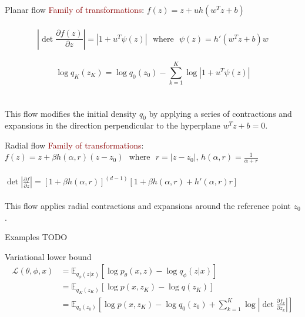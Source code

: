 \documentclass[unicode,11pt]{beamer}
\begin{document}
\begin{frame}[fragile]{Planar flow}
  \textcolor{darkred}{Family of transformations}: $f(z) = z + uh\left( w^T z + b \right)$\\
  ~\\
  $$\left\vert \det \frac{\partial f(z)}{\partial z} \right\vert = \left\vert 1 + u^T \psi(z)
  \right\vert ~~~\text{where}~~~ \psi(z) = h'(w^Tz + b)w$$ \\
  $$\log q_K(z_K) = \log q_0(z_0) − \sum_{k=1}^K \log \left\vert 1 + u^T \psi(z) \right\vert $$\\
  ~\\
  This flow modifies the initial density $q_0$ by applying a series of contractions and expansions in
  the direction perpendicular to the hyperplane $w^Tz+b = 0$.

\end{frame}

\begin{frame}[fragile]{Radial flow}
  \textcolor{darkred}{Family of transformations}: \\
  $f(z) = z + \beta h(\alpha, r)(z-z_0) ~~~\text{where}~~~ r = \vert z-z_0 \vert$,
  $h(\alpha, r) = \frac{1}{\alpha + r}$\\
  ~\\
  $\det \left\vert \frac{\partial f}{\partial z} \right\vert = [1 + \beta h(\alpha, r)]^{(d-1)}
  [1 + \beta h(\alpha, r) + h'(\alpha, r) r]$\\
  ~\\
  This flow applies radial contractions and expansions around the reference point $z_0$.
\end{frame}

\begin{frame}[fragile]{Examples}
  TODO
\end{frame}

\begin{frame}[fragile]{Variational lower bound}
  \begin{align*}
  \mathcal{L}(\theta, \phi, x) &= \mathbb{E}_{q_\phi(z|x)} \left[ \log p_\theta(x, z) - \log q_\phi(z | x) \right] \\
  &= \mathbb{E}_{q_K(z_K)} \left[ \log p(x, z_K) - \log q(z_K) \right] \\
  &= \mathbb{E}_{q_0(z_0)} \left[ \log p(x, z_K) - \log q_0(z_0) + \sum_{k=1}^K \log \left\vert \det
  \frac{\partial f_k}  {\partial z_k} \right\vert \right]
  \end{align*}
\end{frame}
\end{document}
